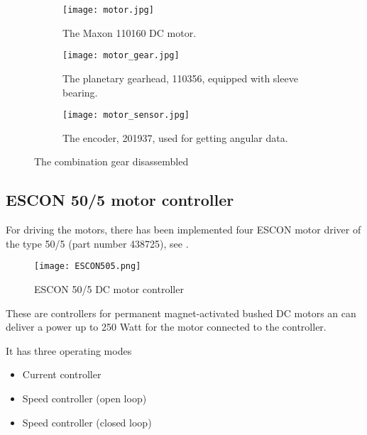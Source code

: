 \begin{figure}[H]
	\centering
	\begin{subfigure}{.32\textwidth}
		\vspace{0pt}
		\centering
		\texttt{[image: motor.jpg]}
		\caption{The Maxon 110160 \newline DC motor.}
		\label{fig:motor}
	\end{subfigure}
	\begin{subfigure}{.32\textwidth}
		\centering
		\texttt{[image: motor\_gear.jpg]}
		\caption{The planetary gearhead, 110356, equipped with sleeve bearing.}
		\label{fig:motor_gear}
	\end{subfigure}
	\begin{subfigure}{.32\textwidth}
	\hspace{5pt}
		\centering
		\texttt{[image: motor\_sensor.jpg]}
		\caption{The encoder, 201937, used for getting angular data.}
		\label{fig:motor_sensor}
	\end{subfigure}
	\caption{The combination gear disassembled}
	\label{fig:Full_motor _dis}
\end{figure}





\subsection{ESCON 50/5 motor controller}\label{sec:motor_control}
For driving the motors, there has been implemented four ESCON motor driver of the type 50/5 (part number 438725), see . 

\begin{figure}[H]
	\centering
		\centering
		\texttt{[image: ESCON505.png]}
		\caption{ESCON 50/5 DC motor controller\cite{ESCON_motor_controller}}
		\label{fig:ESCON505}
\end{figure}

These are controllers for permanent magnet-activated bushed DC motors an can deliver a power up to 250 Watt for the motor connected to the controller. 

It has three operating modes

\begin{itemize}
\item Current controller
\item Speed controller (open loop)
\item Speed controller (closed loop)
\end{itemize}

